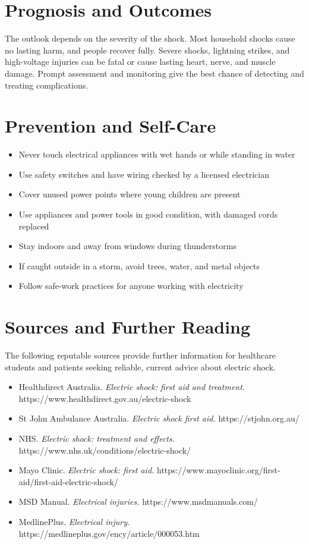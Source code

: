 \section*{Prognosis and Outcomes}
The outlook depends on the severity of the shock. Most household shocks cause no lasting harm, and people recover fully. Severe shocks, lightning strikes, and high-voltage injuries can be fatal or cause lasting heart, nerve, and muscle damage. Prompt assessment and monitoring give the best chance of detecting and treating complications.

\section*{Prevention and Self-Care}
\begin{itemize}
    \item Never touch electrical appliances with wet hands or while standing in water
    \item Use safety switches and have wiring checked by a licensed electrician
    \item Cover unused power points where young children are present
    \item Use appliances and power tools in good condition, with damaged cords replaced
    \item Stay indoors and away from windows during thunderstorms
    \item If caught outside in a storm, avoid trees, water, and metal objects
    \item Follow safe-work practices for anyone working with electricity
\end{itemize}

\section*{Sources and Further Reading}
The following reputable sources provide further information for healthcare students and patients seeking reliable, current advice about electric shock.
\begin{itemize}
    \item Healthdirect Australia. \textit{Electric shock: first aid and treatment.} https://www.healthdirect.gov.au/electric-shock
    \item St John Ambulance Australia. \textit{Electric shock first aid.} https://stjohn.org.au/
    \item NHS. \textit{Electric shock: treatment and effects.} https://www.nhs.uk/conditions/electric-shock/
    \item Mayo Clinic. \textit{Electric shock: first aid.} https://www.mayoclinic.org/first-aid/first-aid-electric-shock/
    \item MSD Manual. \textit{Electrical injuries.} https://www.msdmanuals.com/
    \item MedlinePlus. \textit{Electrical injury.} https://medlineplus.gov/ency/article/000053.htm
\end{itemize}
